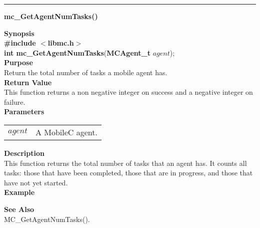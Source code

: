 \noindent
\vspace{5pt}
\rule{6.5in}{0.015in}
\noindent
{\LARGE \bf mc\_GetAgentNumTasks()}\\
{}

\noindent
{\bf Synopsis}\\
{\bf \#include $<$libmc.h$>$}\\
{\bf int mc\_GetAgentNumTasks}({\bf MCAgent\_t} $agent$);\\

\noindent
{\bf Purpose}\\
Return the total number of tasks a mobile agent has. \\

\noindent
{\bf Return Value}\\
This function returns a non negative integer on success and a negative 
integer on failure.\\

\noindent
{\bf Parameters}
\vspace{-0.1in}
\begin{description}
\item               
\begin{tabular}{p{10 mm}p{145 mm}}
$agent$ & A MobileC agent. 
\end{tabular}
\end{description}

\noindent
{\bf Description}\\
This function returns the total number of tasks that an agent has. 
It counts all tasks: those that have been completed, those that are in 
progress, and those that have not yet started.\\

\noindent
{\bf Example}

\noindent
{\bf See Also}\\
MC\_GetAgentNumTasks().

